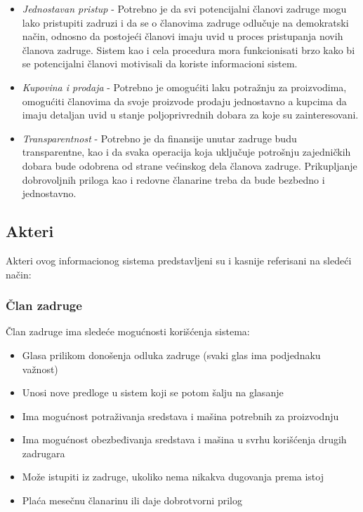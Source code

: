 \documentclass[a4paper]{article}
\begin{document}
\begin{itemize}
  \item \textit{Jednostavan pristup} - Potrebno je da svi potencijalni članovi zadruge mogu lako pristupiti zadruzi i da se o članovima zadruge odlučuje na demokratski način, odnosno da postojeći članovi imaju uvid u proces pristupanja novih članova zadruge. Sistem kao i cela procedura mora funkcionisati brzo kako bi se potencijalni članovi motivisali da koriste informacioni sistem. 
  
  \item \textit{Kupovina i prodaja} - Potrebno je omogućiti laku potražnju za proizvodima, omogućiti članovima da svoje proizvode prodaju jednostavno a kupcima da imaju detaljan uvid u stanje poljoprivrednih dobara za koje su zainteresovani.
  
  \item \textit{Transparentnost} - Potrebno je da finansije unutar zadruge budu transparentne, kao i da svaka operacija koja uključuje potrošnju zajedničkih dobara bude odobrena od strane većinskog dela članova zadruge. Prikupljanje dobrovoljnih priloga kao i redovne članarine treba da bude bezbedno i jednostavno. 
\end{itemize}


\subsection{Akteri}
\indent  Akteri ovog informacionog sistema predstavljeni su i kasnije referisani na sledeći način:


\subsubsection{Član zadruge}
\indent Član zadruge ima sledeće mogućnosti korišćenja sistema:
\begin{itemize}
    \item Glasa prilikom donošenja odluka zadruge (svaki glas ima podjednaku važnost)
    \item Unosi nove predloge u sistem koji se potom šalju na glasanje
    \item Ima mogućnost potraživanja sredstava i mašina potrebnih za proizvodnju
    \item Ima mogućnost obezbeđivanja sredstava i mašina u svrhu korišćenja drugih zadrugara
    \item Može istupiti iz zadruge, ukoliko nema nikakva dugovanja prema istoj
    \item Plaća mesečnu članarinu ili daje dobrotvorni prilog
    
\end{itemize}
\end{document}
